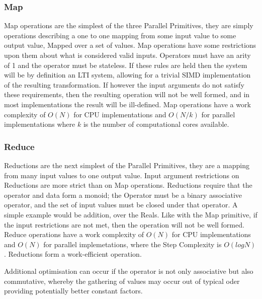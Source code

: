 \subsubsection{Map}

Map operations are the simplest of the three Parallel Primitives, they are simply operations
describing a one to one mapping from some input value to some output value, Mapped over a set of
values. Map operations have some restrictions upon them about what is considered valid inputs.
Operators must have an arity of 1 and the operator must be stateless. If these rules are held then
the system will be by definition an LTI system, allowing for a trivial SIMD implementation of the
resulting transformation. If however the input arguments do not satisfy these requirements, then the
resulting operation will not be well formed, and in most implementations the result will be
ill-defined. Map operations have a work complexity of $ O(N) $ for CPU implementations and $ O(N/k)
$ for parallel implementations where $ k $ is the number of computational cores available.

\subsubsection{Reduce}

Reductions are the next simplest of the Parallel Primitives, they are a mapping from many input
values to one output value. Input argument restrictions on Reductions are more strict than on Map
operations. Reductions require that the operator and data form a monoid; the Operator must be a
binary associative operator, and the set of input values must be closed under that operator. A
simple example would be addition, over the Reals. Like with the Map primitive, if the input
restrictions are not met, then the operation will not be well formed. Reduce operations have a work
complexity of $ O(N) $ for CPU implementations and $ O(N) $ for parallel implemetations, where the
Step Complexity is $ O(log N) $. Reductions form a work-efficient operation.

Additional optimisation can occur if the operator is not only associative but also commutative,
whereby the gathering of values may occur out of typical oder providing potentially better constant
factors.

